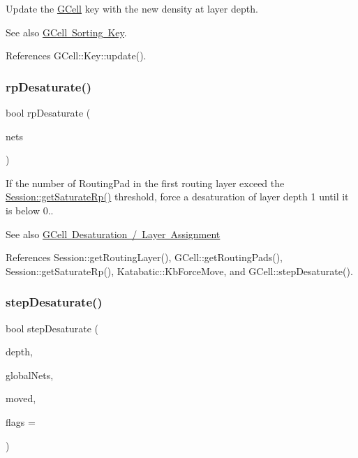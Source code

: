 Update the \mbox{\hyperlink{classKatabatic_1_1GCell}{G\+Cell}} key with the new density at layer {\ttfamily depth}.

\begin{DoxySeeAlso}{See also}
\mbox{\hyperlink{classKatabatic_1_1GCell_secGCellSortingKey}{G\+Cell Sorting Key}}. 
\end{DoxySeeAlso}


References G\+Cell\+::\+Key\+::update().

\mbox{\label{classKatabatic_1_1GCell_a11f07f57cc33fcd4b2d310145c778801}} 
\subsubsection{\texorpdfstring{rp\+Desaturate()}{rpDesaturate()}}
{\footnotesize\ttfamily bool rp\+Desaturate (\begin{DoxyParamCaption}\item[{set$<$ \textbf{ Net} $\ast$$>$ \&}]{nets }\end{DoxyParamCaption})}

If the number of Routing\+Pad in the first routing layer exceed the \mbox{\hyperlink{classKatabatic_1_1Session_adfdaa8b3e81de14fce1f99444b35fcda}{Session\+::get\+Saturate\+Rp()}} threshold, force a desaturation of layer {\ttfamily depth} 1 until it is below 0..

\begin{DoxySeeAlso}{See also}
\mbox{\hyperlink{classKatabatic_1_1GCell_secGCellDesaturation}{G\+Cell Desaturation / Layer Assignment}} 
\end{DoxySeeAlso}


References Session\+::get\+Routing\+Layer(), G\+Cell\+::get\+Routing\+Pads(), Session\+::get\+Saturate\+Rp(), Katabatic\+::\+Kb\+Force\+Move, and G\+Cell\+::step\+Desaturate().

\mbox{\label{classKatabatic_1_1GCell_a5ae4d250ebecf59aa98fb068d848be14}} 
\subsubsection{\texorpdfstring{step\+Desaturate()}{stepDesaturate()}}
{\footnotesize\ttfamily bool step\+Desaturate (\begin{DoxyParamCaption}\item[{unsigned int}]{depth,  }\item[{set$<$ \textbf{ Net} $\ast$$>$ \&}]{global\+Nets,  }\item[{\mbox{\hyperlink{classKatabatic_1_1AutoSegment}{Auto\+Segment}} $\ast$\&}]{moved,  }\item[{unsigned int}]{flags = {} }\end{DoxyParamCaption})}


